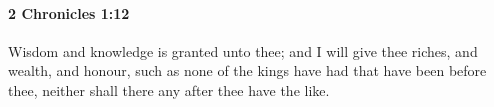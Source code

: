 
		\paragraph{2 Chronicles 1:12} %
			\label{2CHRONICLES-1-12}

			Wisdom and knowledge is granted unto thee; and I will give thee riches, and wealth, and honour, such as none of the kings have had that have been before thee, neither shall there any after thee have the like.


